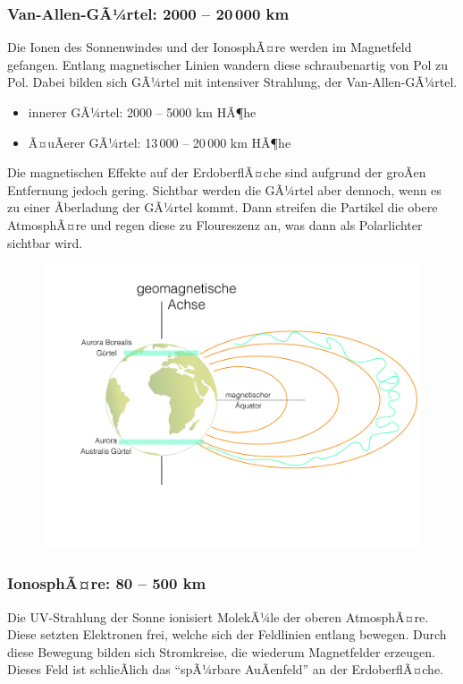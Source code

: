 \subsubsection{Van-Allen-GÃ¼rtel: 2000 -- 20\,000 km}
Die Ionen des Sonnenwindes und der IonosphÃ¤re werden im Magnetfeld gefangen. Entlang magnetischer Linien wandern diese schraubenartig von Pol zu Pol. Dabei bilden sich GÃ¼rtel mit intensiver Strahlung, der Van-Allen-GÃ¼rtel.\begin{itemize}
	\item innerer GÃ¼rtel: 2000 -- 5000 km HÃ¶he
	\item Ã¤uÃerer GÃ¼rtel: 13\,000 -- 20\,000 km HÃ¶he
\end{itemize} 
Die magnetischen Effekte auf der ErdoberflÃ¤che sind aufgrund der groÃen Entfernung jedoch gering. Sichtbar werden die GÃ¼rtel aber dennoch, wenn es zu einer Ãberladung der GÃ¼rtel kommt. Dann streifen die Partikel die obere AtmosphÃ¤re und regen diese zu Floureszenz an, was dann als Polarlichter sichtbar wird.

\begin{figure}[H]
	\centering
	\includegraphics[width = \textwidth]{MagnetikBilder/VanAllenGuertel}
\end{figure}


\subsubsection{IonosphÃ¤re: 80 -- 500 km}
Die UV-Strahlung der Sonne ionisiert MolekÃ¼le der oberen AtmosphÃ¤re. Diese setzten Elektronen frei, welche sich der Feldlinien entlang bewegen. Durch diese Bewegung bilden sich Stromkreise, die wiederum Magnetfelder erzeugen.
Dieses Feld ist schlieÃlich das "`spÃ¼rbare AuÃenfeld"' an der ErdoberflÃ¤che.


